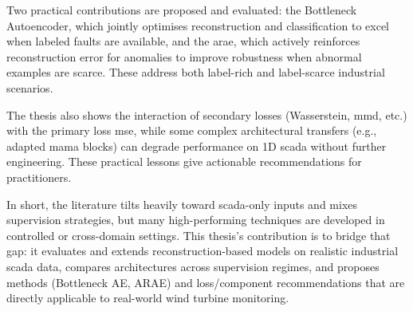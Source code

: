 Two practical contributions are proposed and evaluated: the Bottleneck Autoencoder, which jointly optimises reconstruction and classification to excel when labeled faults are available, and the \gls{arae}, which actively reinforces reconstruction error for anomalies to improve robustness when abnormal examples are scarce. 
These address both label-rich and label-scarce industrial scenarios.

The thesis also shows the interaction of secondary losses (Wasserstein, \gls{mmd}, etc.) with the primary loss \gls{mse}, while some complex architectural transfers (e.g., adapted \gls{mama} blocks) can degrade performance on 1D \gls{scada} without further engineering.
These practical lessons give actionable recommendations for practitioners.

In short, the literature tilts heavily toward \gls{scada}-only inputs and mixes supervision strategies, but many high-performing techniques are developed in controlled or cross-domain settings. 
This thesis's contribution is to bridge that gap: it evaluates and extends reconstruction-based models on realistic industrial \gls{scada} data, compares architectures across supervision regimes, and proposes methods (Bottleneck AE, ARAE) and loss/component recommendations that are directly applicable to real-world wind turbine monitoring.
